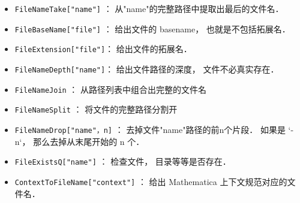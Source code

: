 
\begin{itemize}
\item \verb`FileNameTake["name"]` ： 从"name"的完整路径中提取出最后的文件名．
\item \verb`FileBaseName["file"]` ： 给出文件的 basename， 也就是不包括拓展名．
\item \verb`FileExtension["file"]`： 给出文件的拓展名．
\item \verb`FileNameDepth["name"]`： 给出文件路径的深度， 文件不必真实存在．
\end{itemize}


\begin{itemize}
\item \verb`FileNameJoin` ： 从路径列表中组合出完整的文件名
\item \verb`FileNameSplit` ： 将文件的完整路径分割开
\item \verb`FileNameDrop["name"，n]` ： 去掉文件"name"路径的前n个片段． 如果是 \ver`-n`， 那么去掉从末尾开始的 n 个．
\item \verb`FileExistsQ["name"]`  ： 检查文件， 目录等等是否存在．
\item \verb`ContextToFileName["context"]`  ： 给出 Mathematica 上下文规范对应的文件名．
\end{itemize}



